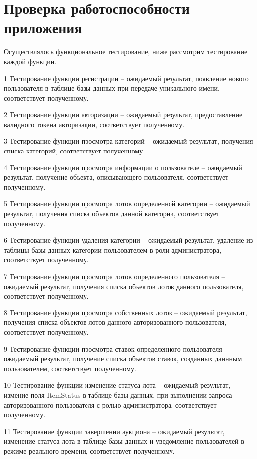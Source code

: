 \section{Проверка работоспособности приложения}

Осуществлялось функциональное тестирование, ниже рассмотрим тестирование каждой функции.

1 Тестирование функции регистрации – ожидаемый результат, появление нового пользователя в 
таблице базы данных при передаче уникального имени, соответствует полученному.

2 Тестирование функции авторизации – ожидаемый результат, предоставление валидного токена авторизации, 
соответствует полученному.

3 Тестирование функции просмотра категорий – ожидаемый результат, получения списка категорий, соответствует полученному.

4 Тестирование функции просмотра информации о пользователе – ожидаемый результат,
 получение объекта, описывающего пользователя, соответствует полученному.

5 Тестирование функции просмотра лотов определенной категории – ожидаемый результат, получения списка объектов данной категории, соответствует полученному.

6 Тестирование функции удаления категории – ожидаемый результат, удаление из таблицы базы данных категории пользователем в роли администратора, 
соответствует полученному.

7 Тестирование функции просмотра лотов определенного пользователя – ожидаемый результат, получения списка объектов лотов данного пользователя, соответствует полученному.

8 Тестирование функции просмотра собственных лотов – ожидаемый результат, получения списка объектов лотов данного 
авторизованного пользователя, соответствует полученному.

9 Тестирование функции просмотра ставок определенного пользователя – ожидаемый результат, получение списка объектов ставок, 
созданных даннным пользователем, соответствует полученному.

10 Тестирование функции изменение статуса лота – ожидаемый результат, 
измение поля ItemStatus в таблице базы данных, при выполнении запроса авторизованного пользователя с ролью администратора,
соответствует полученному.

11 Тестирование функции завершении аукциона – ожидаемый результат, изменение статуса лота в таблице базы данных
и уведомление пользователей в режиме реального времени, соответствует полученному.

